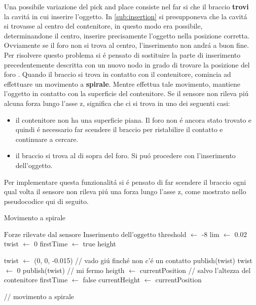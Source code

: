 Una possibile variazione del pick and place consiste nel far si che il braccio \textbf{trovi} la cavit\'{a} in cui inserire l'oggetto. 
In \ref{sub:insertion} si presupponeva che la cavit\'{a} si trovasse al centro del contenitore, in questo modo era possibile, 
determinandone il centro, inserire precisamente l'oggetto nella posizione corretta. Ovviamente se il foro non si trova al centro, 
l'inserimento non andr\'{a} a buon fine. Per risolvere questo problema si \'{e} pensato di sostituire la parte di inserimento 
precedentemente descritta con un nuovo nodo in grado di trovare la posizione del foro \cite{spiral}. 
Quando il braccio si trova in contatto con il contenitore, comincia ad effettuare un movimento a \textbf{spirale}. 
Mentre effettua tale movimento, mantiene l'oggetto in contatto con la superficie del contenitore. Se il sensore 
non rileva pi\'{u} alcuna forza lungo l'asse z, significa che ci si trova in uno dei seguenti casi:
\begin{itemize}
    \item il contenitore non ha una superficie piana. Il foro non \'{e} ancora stato trovato e quindi \'{e} necessario far scendere 
    il braccio per ristabilire il contatto e continuare a cercare.
    \item il braccio si trova al di sopra del foro. Si pu\'{o} procedere con l'inserimento dell'oggetto.
\end{itemize} 
Per implementare questa funzionalit\'{a} si \'{e} pensato di far scendere il braccio ogni qual volta il sensore non rileva pi\'{u}
una forza lungo l'asse z, come mostrato nello pseudocodice qui di seguito. 
\begin{algorithm}[H]
    \caption{Movimento a spirale}\label{algo:spiral}
    \begin{algorithmic}[1]
        \Require $\text{Forze rilevate dal sensore}$
        \Ensure $\text{Inserimento dell'oggetto}$
        \State threshold $\gets$ -8
        \State lim $\gets$ 0.02
        \State twist $\gets$ 0
        \State firstTime $\gets$ true
        \State height
        
        \Repeat 
                \State twist $\gets$ (0, 0, -0.015) // vado gi\'{u} finch\'{e} non c'\'{e} un contatto
                \State publish(twist)
            \EndWhile
            \State twist $\gets$ 0
            \State publish(twist) // mi fermo
                \State heigth $\gets$ currentPosition // salvo l'altezza del contenitore
                \State firstTime $\gets$ false
            \EndIf
            \State currentHeight $\gets$ currentPosition

                // movimento a spirale
            \EndWhile
    \end{algorithmic}
    \end{algorithm}

